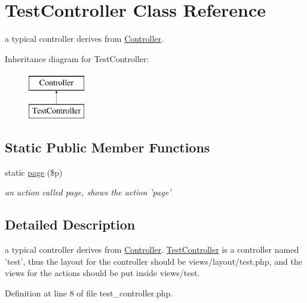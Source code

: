 \hypertarget{class_test_controller}{
\section{TestController Class Reference}
\label{class_test_controller}
}


a typical controller derives from \hyperlink{class_controller}{Controller}.  


Inheritance diagram for TestController:\begin{figure}[H]
\begin{center}
\leavevmode
\includegraphics[height=2.000000cm]{class_test_controller}
\end{center}
\end{figure}
\subsection*{Static Public Member Functions}
\begin{DoxyCompactItemize}
\item 
static \hyperlink{class_test_controller_a1f40e85d8731af503764b4098ee17275}{page} (\$p)
\begin{DoxyCompactList}\small\item\em an action called page, shows the action 'page' \item\end{DoxyCompactList}\end{DoxyCompactItemize}


\subsection{Detailed Description}
a typical controller derives from \hyperlink{class_controller}{Controller}. \hyperlink{class_test_controller}{TestController} is a controller named 'test', thus the layout for the controller should be views/layout/test.php, and the views for the actions should be put inside views/test. 

Definition at line 8 of file test\_\-controller.php.



